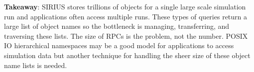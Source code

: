 
\textbf{Takeaway}: SIRIUS stores trillions of objects for a single large scale
simulation run and applications often access multiple runs. These types of
queries return a large list of object names so the bottleneck is managing,
transferring, and traversing these lists. The size of RPCs is the problem, not
the number. POSIX IO hierarchical namespaces may be a good model for
applications to access simulation data but another technique for handling the
sheer size of these object name lists is needed.

